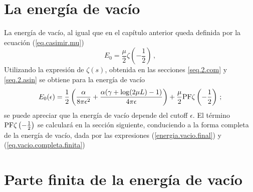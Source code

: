 \begin{comment}
\left(
	    - \sum _{n=1} ^{\infty} \frac{n a_n}{x ^{n+1}}
		\right)
\sum _{p =0} ^{\infty}
		\left(
			    \sum _{m=1} ^{\infty} \frac{a _n}{x ^{n}}
	    		\right) ^{p}
\end{array}
\end{equation}

Donde se puede hacer el producto de Cauchy para tener la solución exacta de hasta que términos hay que desarrollar $S,S'$ y la Serie Geométrica.

\begin{equation}
\frac{1 }{2 \pi i}
\int _{circulo} \lambda ^{-2s } \partial \lambda \ Ln \left[
					\frac{e ^{\frac{i \alpha  \log ( 2 \lambda L )}{2 \lambda}} e ^{2 i \lambda L} S1}
					{\Gamma \left( 1 - \frac{i \alpha}{2 \lambda} \right)} - 
					\frac{e ^{\frac{-i \alpha  \log (2 \lambda L )}{2 \lambda}} S2}
					{\Gamma \left( 1 + \frac{i \alpha}{2 \lambda} \right)}					
					\right] d \lambda
\end{equation}
\end{comment}

\section{La energía de vacío}\label{sec.parte.finita.vacio}

La energía de vacío, al igual que en el capítulo anterior queda definida por la ecuación (\ref{eq.casimir.mu})
\begin{equation}
\nonumber
    E _0 = \frac{\mu }{2}  
    \zeta  \left( - \frac{1}{2} \right) 
	\, ,
\end{equation}
Utilizando la expresión de $\zeta  (s )$, obtenida en las secciones \ref{seq.2.com} y \ref{seq.2.asin} se obtiene para la energía de vacío
\begin{equation}\label{eq.casimir.resultado}
E _0 ( \epsilon ) = \frac{1}{2} \left(
				\frac{\alpha}{8 \pi  \epsilon ^ 2}  + 
				\frac{\alpha ( \gamma  +  \log (2\mu L ) -1 )}{4 \pi  \epsilon}
				\right) + 
				\frac{\mu}{2} {\rm PF } \zeta \left( - \frac{1}{2} \right)
\, ;
\end{equation}
se puede apreciar que la energía de vacío depende del cutoff $\epsilon$. El término ${\rm PF } \zeta \left( - \frac{1}{2} \right)$ se calculará en la sección siguiente, conduciendo a la forma completa de la energía de vacío, dada por las expresiones  (\ref{energia.vacio.final}) y (\ref{eq.vacio.completa.finita})


\section{Parte finita de la energía de vacío}
\label{sec.regular}

